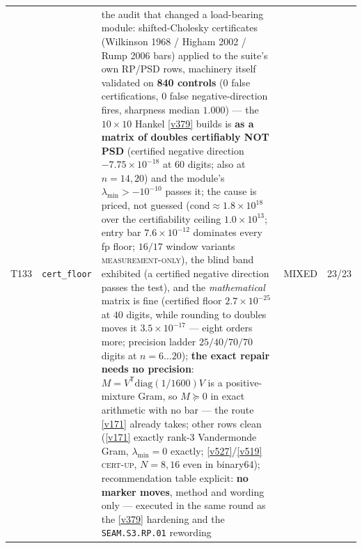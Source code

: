 \documentclass[11pt,a4paper]{article}
\begin{document}
{\begin{xltabular}{\linewidth}{@{}p{0.95cm} >{\raggedright\arraybackslash}p{3.1cm} Y >{\raggedright\scriptsize\arraybackslash}p{3.35cm} p{1.15cm}@{}}
T133 & \texttt{\scriptsize cert\_\allowbreak floor} & the audit that changed a load-bearing module: shifted-Cholesky certificates (Wilkinson 1968 / Higham 2002 / Rump 2006 bars) applied to the suite's own RP/PSD rows, machinery itself validated on \textbf{840 controls} ($0$ false certifications, $0$ false negative-direction fires, sharpness median $1.000$) --- the $10\times10$ Hankel \vref{v379} builds is \textbf{as a matrix of doubles certifiably NOT PSD} (certified negative direction $-7.75\times10^{-18}$ at $60$ digits; also at $n=14,20$) and the module's $\lambda_{\min}>-10^{-10}$ passes it; the cause is priced, not guessed ($\mathrm{cond}\approx1.8\times10^{18}$ over the certifiability ceiling $1.0\times10^{13}$; entry bar $7.6\times10^{-12}$ dominates every fp floor; $16/17$ window variants \textsc{measurement-only}), the blind band exhibited (a certified negative direction passes the test), and the \emph{mathematical} matrix is fine (certified floor $2.7\times10^{-25}$ at $40$ digits, while rounding to doubles moves it $3.5\times10^{-17}$ --- eight orders more; precision ladder $25/40/70/70$ digits at $n=6\ldots20$); \textbf{the exact repair needs no precision}: $M=V^{\mathsf T}\mathrm{diag}(1/1600)V$ is a positive-mixture Gram, so $M\succeq0$ in exact arithmetic with no bar --- the route \vref{v171} already takes; other rows clean (\vref{v171} exactly rank-$3$ Vandermonde Gram, $\lambda_{\min}=0$ exactly; \vref{v527}/\vref{v519} \textsc{cert-up}, $N=8,16$ even in binary64); recommendation table explicit: \textbf{no marker moves}, method and wording only --- executed in the same round as the \vref{v379} hardening and the \texttt{SEAM.S3.RP.01} rewording & MIXED & 23/23\\

\end{xltabular}}
\end{document}
